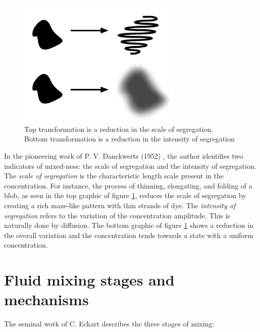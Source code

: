 \begin{figure}
	\centering
	\includegraphics[width=0.7\textwidth]{ch-introduction/images/scale-and-intensity}
	\caption{Top transformation is a reduction in the scale of segregation. Bottom transformation is a reduction in the intensity of segregation}
	\label{fig:scale-and-intensity}
\end{figure}

In the pioneering work of P. V. Danckwerts (1952) \cite{Danckwerts1952}, the author identifies two indicators of mixed-ness: the scale of segregation and the intensity of segregation. The {\it scale of segregation } is the characteristic length scale present in the concentration. For instance, the process of thinning, elongating, and folding of a blob, as seen in the top graphic of figure \ref{fig:scale-and-intensity}, reduces the scale of segregation by creating a rich maze-like pattern with thin strands of dye.  The {\it intensity of segregation } refers to the variation of the concentration amplitude. This is naturally done by diffusion. The bottom graphic of figure \ref{fig:scale-and-intensity} shows a reduction in the overall variation and the concentration tends towards a state with a uniform concentration.





\section{Fluid mixing stages and mechanisms}

The seminal work of C. Eckart \cite{Eckart1948} describes the three stages of mixing:

